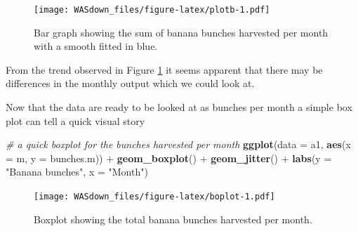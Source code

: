 \documentclass[]{book}
\newenvironment{Shaded}{\begin{snugshade}}{\end{snugshade}}
\newcommand{\KeywordTok}[1]{\textcolor[rgb]{0.13,0.29,0.53}{\textbf{{#1}}}}
\newcommand{\DataTypeTok}[1]{\textcolor[rgb]{0.13,0.29,0.53}{{#1}}}
\newcommand{\StringTok}[1]{\textcolor[rgb]{0.31,0.60,0.02}{{#1}}}
\newcommand{\CommentTok}[1]{\textcolor[rgb]{0.56,0.35,0.01}{\textit{{#1}}}}
\newcommand{\NormalTok}[1]{{#1}}
\theoremstyle{definition}
\theoremstyle{definition}
\theoremstyle{remark}
\begin{document}
\begin{figure}[htbp]
\centering
\texttt{[image: WASdown\_files/figure-latex/plotb-1.pdf]}
\caption{\label{fig:plotb}Bar graph showing the sum of banana bunches
harvested per month with a smooth fitted in blue.}
\end{figure}

From the trend observed in Figure \ref{fig:plotb} it seems apparent that
there may be differences in the monthly output which we could look at.

\begin{Shaded}
\end{Shaded}

Now that the data are ready to be looked at as bunches per month a
simple box plot can tell a quick visual story

\begin{Shaded}
\begin{Highlighting}[]
\CommentTok{# a quick boxplot for the bunches harvested per month}
\KeywordTok{ggplot}\NormalTok{(}\DataTypeTok{data =} \NormalTok{a1, }\KeywordTok{aes}\NormalTok{(}\DataTypeTok{x =} \NormalTok{m, }\DataTypeTok{y =} \NormalTok{bunches.m)) +}
\StringTok{  }\KeywordTok{geom_boxplot}\NormalTok{() +}
\StringTok{  }\KeywordTok{geom_jitter}\NormalTok{() +}
\StringTok{  }\KeywordTok{labs}\NormalTok{(}\DataTypeTok{y =} \StringTok{"Banana bunches"}\NormalTok{, }\DataTypeTok{x =} \StringTok{"Month"}\NormalTok{)}
\end{Highlighting}
\end{Shaded}

\begin{figure}[htbp]
\centering
\texttt{[image: WASdown\_files/figure-latex/boplot-1.pdf]}
\caption{\label{fig:boplot}Boxplot showing the total banana bunches
harvested per month.}
\end{figure}
\end{document}
